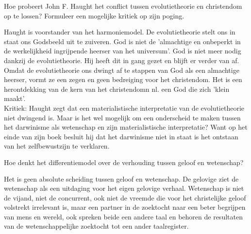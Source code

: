 \documentclass[main.tex]{subfiles}
\begin{document}
\begin{examenvraag}
    \begin{vraag}
        Hoe probeert John F. Haught het conflict tussen evolutietheorie en christendom op te lossen? Formuleer een mogelijke kritiek op zijn poging.
    \end{vraag}

    \begin{antwoord}
		Haught is voorstander van het harmoniemodel.
			De evolutietheorie stelt ons in staat ons Godsbeeld uit te zuiveren. God is niet de 'almachtige en onbeperkt in de werkelijkheid ingrijpende heerser van het universum'. God is niet meer nodig dankzij de evolutietheorie. Hij heeft dit in gang gezet en blijft er verder van af. Omdat de evolutietheorie ons dwingt af te stappen van God als een almachtige heerser, vormt ze een zegen en geen bedreiging voor het christendom. Het is een herontdekking van de kern van het christendomn nl. een God die zich 'klein maakt'.\\
			
			Kritiek: Haught zegt dat een materialistische interpretatie van de evolutietheorie niet dwingend is. Maar is het wel mogelijk om een onderscheid te maken tussen het darwinisme als wetenschap en zijn materialistische interpretatie? Want op het einde van zijn boek besluit hij dat het darwinisme niet in staat is het ontstaan van het zelfbewustzijn te verklaren.
    \end{antwoord}
\end{examenvraag}


\begin{examenvraag}
    \begin{vraag}
    Hoe denkt het differentiemodel over de verhouding tussen geloof en wetenschap?
    \end{vraag}

    \begin{antwoord}
    	Het is geen absolute scheiding tussen geloof en wetenschap. De gelovige ziet de wetenschap als een uitdaging voor het eigen gelovige verhaal. Wetenschap is niet de vijand, niet de concurrent, ook niet de vreemde die voor het christelijke geloof volstrekt irrelevant is, maar een partner in de zoektocht naar een beter begrijpen van mens en wereld, ook spreken beide een andere taal en behoren de resultaten van de wetenschappelijke zoektocht tot een ander taalregister.
    \end{antwoord}
\end{examenvraag}
\end{document}
